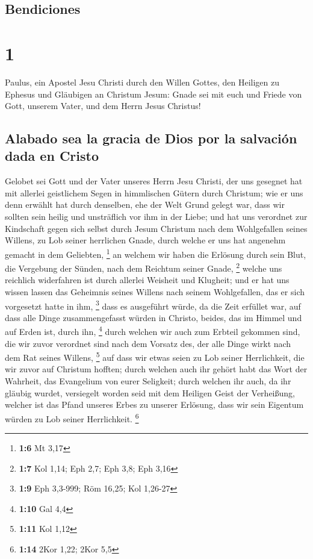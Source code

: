 \hypertarget{bendiciones}{%
\subsection{Bendiciones}\label{bendiciones}}

\hypertarget{section}{%
\section{1}\label{section}}

 Paulus, ein Apostel Jesu Christi durch den Willen Gottes,
den Heiligen zu Ephesus und Gläubigen an Christum Jesum: 
Gnade sei mit euch und Friede von Gott, unserem Vater, und dem Herrn
Jesus Christus!

\hypertarget{alabado-sea-la-gracia-de-dios-por-la-salvaciuxf3n-dada-en-cristo}{%
\subsection{Alabado sea la gracia de Dios por la salvación dada en
Cristo}\label{alabado-sea-la-gracia-de-dios-por-la-salvaciuxf3n-dada-en-cristo}}

 Gelobet sei Gott und der Vater unseres Herrn Jesu
Christi, der uns gesegnet hat mit allerlei geistlichem Segen in
himmlischen Gütern durch Christum;  wie er uns denn
erwählt hat durch denselben, ehe der Welt Grund gelegt war, dass wir
sollten sein heilig und unsträflich vor ihm in der Liebe; 
und hat uns verordnet zur Kindschaft gegen sich selbst durch Jesum
Christum nach dem Wohlgefallen seines Willens,  zu Lob
seiner herrlichen Gnade, durch welche er uns hat angenehm gemacht in dem
Geliebten, \footnote{\textbf{1:6} Mt 3,17}  an welchem wir
haben die Erlösung durch sein Blut, die Vergebung der Sünden, nach dem
Reichtum seiner Gnade, \footnote{\textbf{1:7} Kol 1,14; Eph 2,7; Eph
  3,8; Eph 3,16}  welche uns reichlich widerfahren ist
durch allerlei Weisheit und Klugheit;  und er hat uns
wissen lassen das Geheimnis seines Willens nach seinem Wohlgefallen, das
er sich vorgesetzt hatte in ihm, \footnote{\textbf{1:9} Eph 3,3-999; Röm
  16,25; Kol 1,26-27}  dass es ausgeführt würde, da die
Zeit erfüllet war, auf dass alle Dinge zusammengefasst würden in
Christo, beides, das im Himmel und auf Erden ist, durch ihn, \footnote{\textbf{1:10}
  Gal 4,4}  durch welchen wir auch zum Erbteil gekommen
sind, die wir zuvor verordnet sind nach dem Vorsatz des, der alle Dinge
wirkt nach dem Rat seines Willens, \footnote{\textbf{1:11} Kol 1,12}
 auf dass wir etwas seien zu Lob seiner Herrlichkeit, die
wir zuvor auf Christum hofften;  durch welchen auch ihr
gehört habt das Wort der Wahrheit, das Evangelium von eurer Seligkeit;
durch welchen ihr auch, da ihr gläubig wurdet, versiegelt worden seid
mit dem Heiligen Geist der Verheißung,  welcher ist das
Pfand unseres Erbes zu unserer Erlösung, dass wir sein Eigentum würden
zu Lob seiner Herrlichkeit. \footnote{\textbf{1:14} 2Kor 1,22; 2Kor 5,5}

